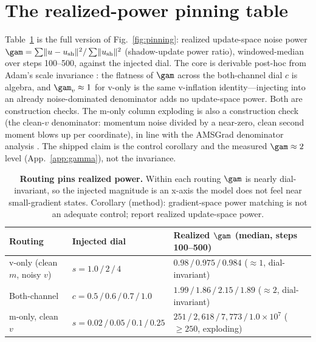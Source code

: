 \section{The realized-power pinning table}
\label{app:pinning}
Table~\ref{tab:pinning-full} is the full version of Fig.~\ref{fig:pinning}:
realized update-space noise power $\gam=\sum\lVert u-u_{\text{sh}}\rVert^2/\sum\lVert
u_{\text{sh}}\rVert^2$ (shadow-update power ratio), windowed-median over steps
100--500, against the injected dial. The core is derivable post-hoc from Adam's
scale invariance \citep{adam}: the flatness of $\gam$ across the both-channel
dial $c$ is algebra, and $\gam_v\approx1$ for v-only is the same v-inflation
identity---injecting into an already noise-dominated denominator adds no
update-space power. Both are construction checks. The m-only column exploding is
also a construction check (the clean-$v$ denominator: momentum noise divided by a
near-zero, clean second moment blows up per coordinate), in line with the AMSGrad
denominator analysis \citep{amsgrad}. The shipped claim is the control corollary
and the measured $\gam\approx2$ level (App.~\ref{app:gamma}), not the invariance.

\begin{table}[h]
\centering
\footnotesize
\begin{tabular}{@{}l l l@{}}
\toprule
Routing & Injected dial & Realized $\gam$ (median, steps 100--500) \\
\midrule
v-only (clean $m$, noisy $v$) & $s=1.0\,/\,2\,/\,4$ & $0.98\,/\,0.975\,/\,0.984$ \quad ($\approx1$, dial-invariant) \\
Both-channel & $c=0.5\,/\,0.6\,/\,0.7\,/\,1.0$ & $1.99\,/\,1.86\,/\,2.15\,/\,1.89$ \quad ($\approx2$, dial-invariant) \\
m-only, clean $v$ & $s=0.02\,/\,0.05\,/\,0.1\,/\,0.25$ & $251\,/\,2{,}618\,/\,7{,}773\,/\,1.0\!\times\!10^{7}$ \quad ($\ge250$, exploding) \\
\bottomrule
\end{tabular}
\caption{\textbf{Routing pins realized power.} Within each routing $\gam$ is
nearly dial-invariant, so the injected magnitude is an x-axis the model does not
feel near small-gradient states. Corollary (method): gradient-space power
matching is not an adequate control; report realized update-space power.}
\label{tab:pinning-full}
\end{table}

